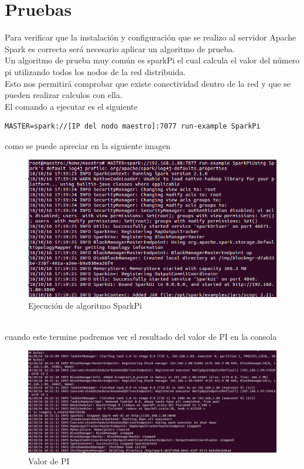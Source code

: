 \section{Pruebas}\label{seccion4}
Para verificar que la instalación y configuración que se realizo al servidor Apache Spark es correcta será necesario aplicar un algoritmo de prueba. 
\\
Un algoritmo de prueba muy común es sparkPi el cual calcula el valor del número pi utilizando todos los nodos de la red distribuida. 
\\
Esto nos permitirá comprobar que existe conectividad dentro de la red y que se pueden realizar calculos con ella.
\\
El comando a ejecutar es el siguiente 
\begin{lstlisting} 
MASTER=spark://[IP del nodo maestro]:7077 run-example SparkPi
\end{lstlisting}
como se puede apreciar en la siguiente imagen \\
\begin{figure}[!htbp]
	\hypertarget{fig:red4}{\hspace{1pt}}
	\begin{center}
		\includegraphics[width=.7\textwidth]{capitulo3/images/im9.png}
		\caption{Ejecución de algoritmo SparkPi}
		\label{fig:red4}
	\end{center}
\end{figure}
\\ cuando este termine podremos ver el resultado del valor de PI en la consola \\
\begin{figure}[!htbp]
	\hypertarget{fig:red5}{\hspace{1pt}}
	\begin{center}
		\includegraphics[width=.7\textwidth]{capitulo3/images/im12.png}
		\caption{Valor de PI}
		\label{fig:red5}
	\end{center}
\end{figure}
